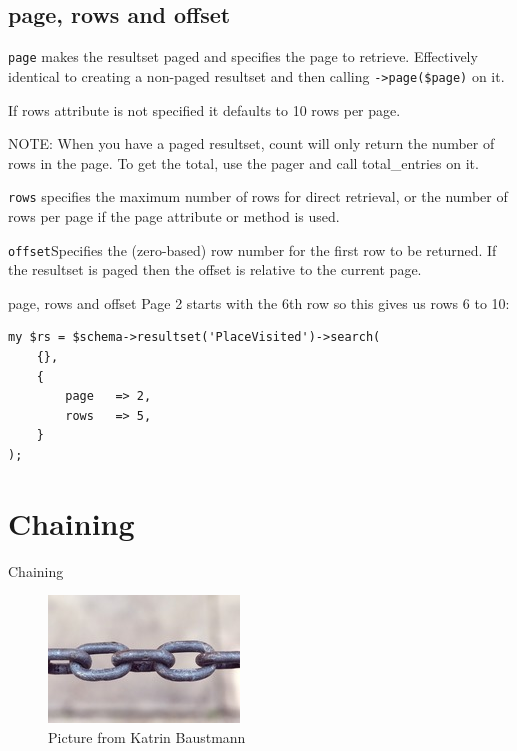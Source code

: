 \subsection{page, rows and offset}

\verb|page| makes the resultset paged and specifies the page to
retrieve. Effectively identical to creating a non-paged resultset and then
calling \verb|->page($page)| on it.

If rows attribute is not specified it defaults to 10 rows per page.

NOTE: When you have a paged resultset, count will only return the number of
rows in the page. To get the total, use the pager and call total\_entries on
it. 

\verb|rows| specifies the maximum number of rows for direct retrieval, or
the number of rows per page if the page attribute or method is used.

\verb|offset|Specifies the (zero-based) row number for the first row to be
returned. If the resultset is paged then the offset is relative to the
current page.

\begin{frame}[fragile]{page, rows and offset}
Page 2 starts with the 6th row so this gives us rows 6 to 10:

\begin{lstlisting}
my $rs = $schema->resultset('PlaceVisited')->search(
    {},
    {
        page   => 2,
        rows   => 5,
    }
);
\end{lstlisting}
\end{frame}

\section{Chaining}

\begin{frame}{Chaining}
  \begin{figure}[!ht]
    \begin{center}
      \includegraphics{img/chains.jpg}
      \caption[Chains]{Picture from Katrin Baustmann}
    \end{center}
  \end{figure}
\end{frame}

